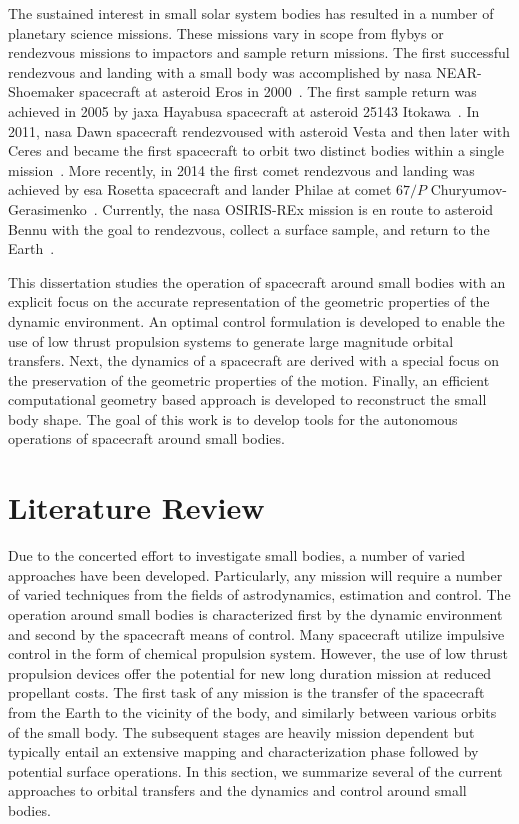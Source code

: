 The sustained interest in small solar system bodies has resulted in a number of planetary science missions.
These missions vary in scope from flybys or rendezvous missions to impactors and sample return missions. 
The first successful rendezvous and landing with a small body was accomplished by \gls{nasa} NEAR-Shoemaker spacecraft at asteroid Eros in \num{2000}~\cite{miller2002}.
The first sample return was achieved in \num{2005} by \gls{jaxa} Hayabusa spacecraft at asteroid 25143 Itokawa~\cite{yoshimitsu2009}.
In \num{2011}, \gls{nasa} Dawn spacecraft rendezvoused with asteroid  Vesta and then later with Ceres and became the first spacecraft to orbit two distinct bodies within a single mission~\cite{rayman2006}.
More recently, in \num{2014} the first comet rendezvous and landing was achieved by \gls{esa} Rosetta spacecraft and lander Philae at comet \(67/P\) Churyumov-Gerasimenko~\cite{bibring2015}.
Currently, the \gls{nasa} OSIRIS-REx mission is en route to asteroid Bennu with the goal to rendezvous, collect a surface sample, and return to the Earth~\cite{beshore2015}.

This dissertation studies the operation of spacecraft around small bodies with an explicit focus on the accurate representation of the geometric properties of the dynamic environment.
An optimal control formulation is developed to enable the use of low thrust propulsion systems to generate large magnitude orbital transfers.
Next, the dynamics of a spacecraft are derived with a special focus on the preservation of the geometric properties of the motion.
Finally, an efficient computational geometry based approach is developed to reconstruct the small body shape.
The goal of this work is to develop tools for the autonomous operations of spacecraft around small bodies.

\section{Literature Review}

Due to the concerted effort to investigate small bodies, a number of varied approaches have been developed.
Particularly, any mission will require a number of varied techniques from the fields of astrodynamics, estimation and control. 
The operation around small bodies is characterized first by the dynamic environment and second by the spacecraft means of control. 
Many spacecraft utilize impulsive control in the form of chemical propulsion system.
However, the use of low thrust propulsion devices offer the potential for new long duration mission at reduced propellant costs.
The first task of any mission is the transfer of the spacecraft from the Earth to the vicinity of the body, and similarly between various orbits of the small body. 
The subsequent stages are heavily mission dependent but typically entail an extensive mapping and characterization phase followed by potential surface operations.
In this section, we summarize several of the current approaches to orbital transfers and the dynamics and  control around small bodies.

